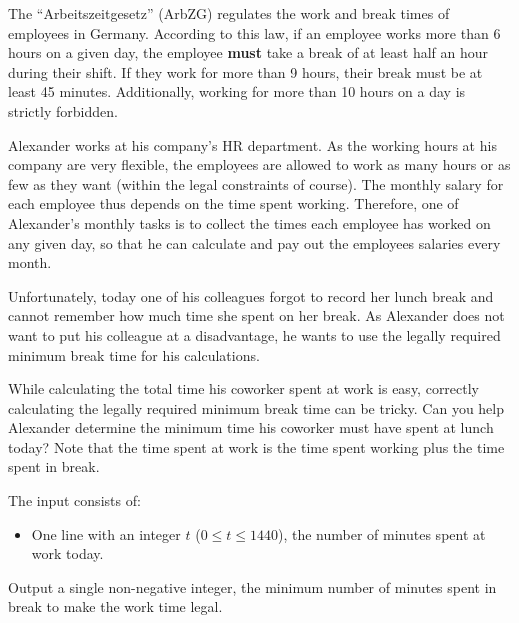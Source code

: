 
\newcommand{\maxt}{1440}

%
%
The ``Arbeitszeitgesetz'' (ArbZG) regulates the work and break times of employees in Germany. According to this law, if an employee works more than 6 hours on a given day, the employee \textbf{must} take a break of at least half an hour during their shift. If they work for more than 9 hours, their break must be at least 45 minutes. Additionally, working for more than 10 hours on a day is strictly forbidden.

Alexander works at his company's HR department. As the working hours at his company are very flexible, the employees are allowed to work as many hours or as few as they want (within the legal constraints of course). The monthly salary for each employee thus depends on the time spent working. Therefore, one of Alexander's monthly tasks is to collect the times each employee has worked on any given day, so that he can calculate and pay out the employees salaries every month.

Unfortunately, today one of his colleagues forgot to record her lunch break and cannot remember how much time she spent on her break. As Alexander does not want to put his colleague at a disadvantage, he wants to use the legally required minimum break time for his calculations.

While calculating the total time his coworker spent at work is easy, correctly calculating the legally required minimum break time can be tricky. Can you help Alexander determine the minimum time his coworker must have spent at lunch today?
Note that the time spent at work is the time spent working plus the time spent in break.

\begin{Input}
    The input consists of:
    \begin{itemize}
        \item One line with an integer $t$ ($0\leq t\leq \maxt$), the number of minutes spent at work today.
    \end{itemize}
\end{Input}

\begin{Output}
    Output a single non-negative integer, the minimum number of minutes spent in break to make the work time legal.
\end{Output}
